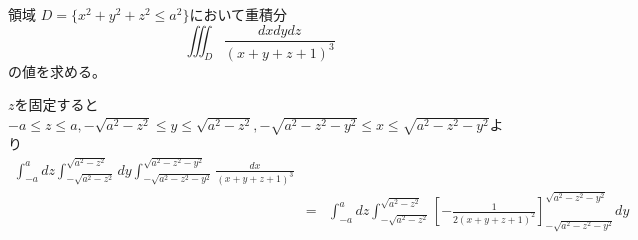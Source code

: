 \documentclass[twocolumn]{jsarticle}
\begin{document}
領域 $D = \{ x^2 + y^2 + z^2 \le a^2 \}$において重積分
\[
\iiint_D \frac{dxdydz}{(x + y + z + 1)^3}
\]
の値を求める。

$z$を固定すると
$-a \le z \le a , -\sqrt{a^2 - z^2} \le y \le \sqrt{a^2 - z^2} , -\sqrt{a^2 - z^2 - y^2} \le x \le \sqrt{a^2 - z^2 - y^2}$より
\begin{eqnarray*}
\int_{-a}^a dz \int_{-\sqrt{a^2 - z^2}}^{\sqrt{a^2 - z^2}} dy \int_{-\sqrt{a^2 - z^2 - y^2}}^{\sqrt{a^2 - z^2 - y^2}} \frac{dx}{(x + y + z + 1)^3} \\
& = & \int_{-a}^a dz \int_{-\sqrt{a^2 - z^2}}^{\sqrt{a^2 - z^2}} \left[ -\frac{1}{2(x + y + z + 1)^2} \right]_{-\sqrt{a^2 - z^2 - y^2}}^{\sqrt{a^2 - z^2 - y^2}} dy \\
\end{eqnarray*}
\end{document}
